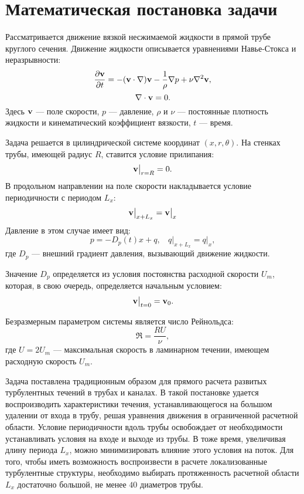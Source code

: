 \section{Математическая постановка задачи} \label{math_section}

Рассматривается движение вязкой несжимаемой жидкости в прямой трубе круглого сечения. Движение жидкости описывается уравнениями Навье-Стокса и неразрывности:
\begin{equation} \label{NS_eq}
\frac{\partial \mathbf{v}}{\partial t} = - (\mathbf{v} \cdot \nabla) \mathbf{v} - \frac{1}{\rho}\nabla p + \nu \nabla^2 \mathbf{v},
\end{equation}
\begin{equation} \label{div_eq}
\nabla \cdot \mathbf{v} = 0.
\end{equation}
Здесь $\mathbf{v}$ --- поле скорости, $p$ --- давление, $\rho$ и $\nu$ --- постоянные плотность жидкости и кинематический коэффициент вязкости, $t$ --- время. 

Задача решается в цилиндрической системе координат $(x,r,\theta)$. На стенках трубы, имеющей радиус $R$, ставится условие прилипания:
\begin{equation} \label{bc1_eq}
\mathbf{v} \big|_{r=R} = 0.
\end{equation}
В продольном направлении на поле скорости накладывается условие периодичности с периодом $L_x$:
\begin{equation} \label{bc2_eq}
\mathbf{v} \big|_{x+L_x} = \mathbf{v} \big|_{x}
\end{equation}
Давление в этом случае имеет вид:
\begin{equation} \label{bc3_eq}
p = - D_p(t)x + q, \ \ \ \  q\big|_{x+L_x} = q\big|_{x},
\end{equation}
где $D_p$ --- внешний градиент давления, вызывающий движение жидкости. 

Значение $D_p$ определяется из условия постоянства расходной скорости $U_m$, которая, в свою очередь, определяется начальным условием:
\begin{equation}
\mathbf{v}\big|_{t=0} = \mathbf{v}_0.
\end{equation}

Безразмерным параметром системы является число Рейнольдса:
\begin{equation} \label{Re_eq}
\Re = \frac{R U}{\nu}, 
\end{equation}
где $U = 2U_m$ --- максимальная скорость в ламинарном течении, имеющем расходную скорость $U_m$. 

Задача поставлена традиционным образом для прямого расчета развитых турбулентных течений в трубах и каналах. В такой постановке удается воспроизводить характеристики течения, устанавливающегося на большом удалении от входа в трубу, решая уравнения движения в ограниченной расчетной области. Условие периодичности вдоль трубы освобождает от необходимости устанавливать условия на входе и выходе из трубы. В тоже время, увеличивая длину периода $L_x$, можно минимизировать влияние этого условия на поток. Для того, чтобы иметь возможность воспроизвести в расчете локализованные турбулентные структуры, необходимо выбирать протяженность расчетной области $L_x$ достаточно большой, не менее $40$ диаметров трубы. 

